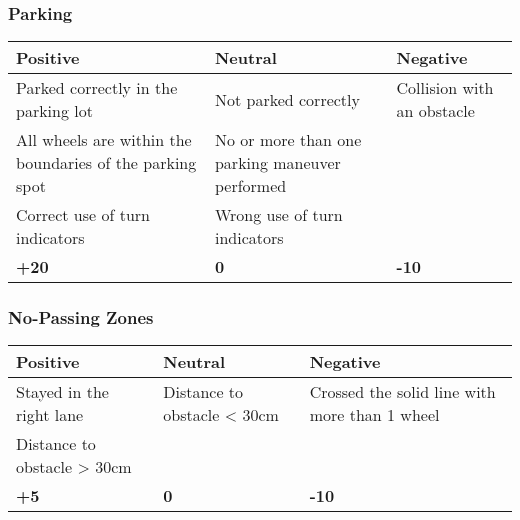 {\begin{highlight}
		\subsubsection*{Parking}
		\begin{table}[H]
			\begin{tabularx}{\textwidth}{XXX}
				\toprule
				\textbf{Positive}                                        & \textbf{Neutral}                               & \textbf{Negative}          \\
				\midrule
				Parked correctly in the parking lot                      & Not parked correctly                           & Collision with an obstacle \\
				All wheels are within the boundaries of the parking spot & No or more than one parking maneuver performed &                            \\
				Correct use of turn indicators                           & Wrong use of turn indicators                   &                            \\
				\topstrut
				\textbf{+20}                                             & \textbf{0}                                     & \textbf{-10}               \\
				\bottomrule
			\end{tabularx}
		\end{table}

		\subsubsection*{No-Passing Zones}
		\begin{table}[H]
			\begin{tabularx}{\textwidth}{XXX}
				\toprule
				\textbf{Positive}           & \textbf{Neutral}            & \textbf{Negative}                             \\
				\midrule
				Stayed in the right lane    & Distance to obstacle < 30cm & Crossed the solid line with more than 1 wheel \\
				Distance to obstacle > 30cm &                             &                                               \\
				\topstrut
				\textbf{+5}                 & \textbf{0}                  & \textbf{-10}                                  \\
				\bottomrule
			\end{tabularx}
		\end{table}


\end{highlight}}

